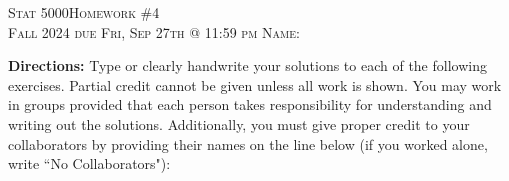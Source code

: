 \documentclass[11pt]{article}
\begin{document}
\large \noindent \textsc{Stat 5000}\hfill \large{\textsc{Homework \#4}} \hfill {} \\
\large \textsc{Fall 2024}  \hfill \textsc{due Fri, Sep 27th @ 11:59 pm} \hfill \textsc{Name:} \underline{\hspace{2in}} \\

\vspace{14pt}

\noindent \textbf{Directions:} Type or clearly handwrite your solutions to each of the following exercises.  Partial credit cannot be given unless all work is shown. You may work in groups provided that each person takes responsibility for understanding and writing out the solutions. Additionally, you must give proper credit to your collaborators by providing their names on the line below (if you worked alone, write ``No Collaborators"):
\vspace{14pt}
\\ \underline{\hspace{7in}}
\vspace{14pt}
\end{document}
